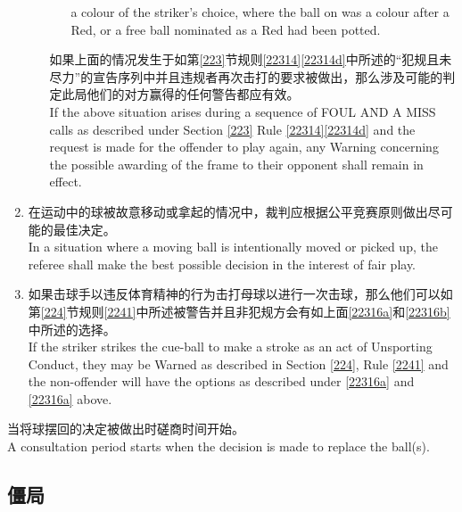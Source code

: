 \begin{enumerate}[label=(\alph*)]
\begin{enumerate}[label=(\roman*)]
\begin{enumerate}[label=(\roman*)]
            a colour of the striker's choice, where the ball on was a colour after a Red, or a free ball nominated as a Red had been potted.
        \end{enumerate}
        如果上面的情况发生于如第\ref{223}节规则\ref{22314}\ref{22314d}中所述的``犯规且未尽力''的宣告序列中并且违规者再次击打的要求被做出，那么涉及可能的判定此局他们的对方赢得的任何警告都应有效。\\
        If the above situation arises during a sequence of FOUL AND A MISS calls as described under Section \ref{223} Rule \ref{22314}\ref{22314d} and the request is made for the offender to play again, any Warning concerning the possible awarding of the frame to their opponent shall remain in effect.
    \end{enumerate}
    \item \label{22316b}在运动中的球被故意移动或拿起的情况中，裁判应根据公平竞赛原则做出尽可能的最佳决定。\\
    In a situation where a moving ball is intentionally moved or picked up, the referee shall make the best possible decision in the interest of fair play.
    \item 如果击球手以违反体育精神的行为击打母球以进行一次击球，那么他们可以如第\ref{224}节规则\ref{2241}中所述被警告并且非犯规方会有如上面\ref{22316a}和\ref{22316b}中所述的选择。\\
    If the striker strikes the cue-ball to make a stroke as an act of Unsporting Conduct, they may be Warned as described in Section \ref{224}, Rule \ref{2241} and the non-offender will have the options as described under \ref{22316a} and \ref{22316a} above.
\end{enumerate}
\noindent 当将球摆回的决定被做出时磋商时间开始。\\
A consultation period starts when the decision is made to replace the ball(s).

\subsection{僵局}\label{22317}

